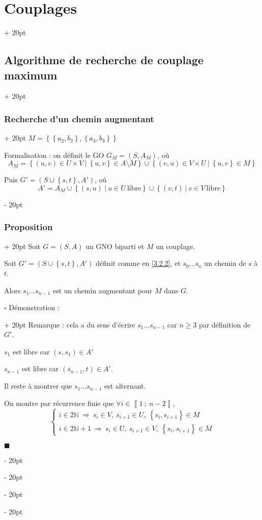 \documentclass[a4paper, 12pt, twoside]{article}
\newcommand{\N}{\mathbb{N}} %
\newcommand{\nset}[2]{\left\llbracket #1\ ;\ #2 \right\rrbracket}
\newcommand{\set}[1]{\left\{ #1 \right\}}
\renewcommand{\ge}{\geqslant}
\newcommand{\ind}[1][20pt]{\advance\leftskip + #1}
\newcommand{\deind}[1][20pt]{\advance\leftskip - #1}
\newenvironment{indt}[2][20pt]{#2 \par \ind[#1]}{\par \deind} %
\newenvironment{proof}[1][{Démonstration :}]{\begin{indt}{$\square$ #1}}{$\blacksquare$ \end{indt}}
\begin{document}
\begin{indt}{\section{Couplages}}
\begin{indt}{\subsection{Algorithme de recherche de couplage maximum}}
\begin{indt}{\subsubsection{Recherche d'un chemin augmentant}}
                $M = \set{\set{a_2, b_2}, \set{a_3, b_3}}$

                \vspace{12pt}
                
                Formalisation : on définit le GO $G_M = (S, A_M)$, où
                \[
                    A_M = \set{(u, v) \in U \times V\ |\ \set{u, v} \in A \setminus M} \cup \set{(v, u) \in V \times U\ |\ \set{u, v} \in M}
                \]

                Puis $G' = (S \cup \set{s, t}, A')$, où
                \[
                    A' = A_M \cup \set{(s, u)\ |\ u \in U\ \text{libre}} \cup \set{(v, t)\ |\ v \in V\ \text{libre}}
                \]
            \end{indt}

            \vspace{12pt}
            
            \begin{indt}{\subsubsection{Proposition}}
                Soit $G = (S, A)$ un GNO biparti et $M$ un couplage.

                Soit $G' = (S \cup \set{s, t}, A')$ définit comme en \ref{3.2.2}, et $s_0 \ldots s_n$ un chemin de $s$ à $t$.

                Alors $s_1 \ldots s_{n - 1}$ est un chemin augmentant pour $M$ dans $G$.

                \vspace{12pt}
                
                \begin{proof}
                    Remarque : cela a du sens d'écrire $s_1 \ldots s_{n - 1}$ car $n \ge 3$ par définition de $G'$.

                    $s_1$ est libre car $(s, s_1) \in A'$

                    $s_{n - 1}$ est libre car $(s_{n - 1}, t) \in A'$.

                    Il reste à montrer que $s_1 \ldots s_{n - 1}$ est alternant.

                    On montre par récurrence finie que $\forall i \in \nset 1 {n - 2}$,
                    \[
                        \begin{cases}
                            i \in 2\N\ \Rightarrow\ s_i \in V,\ s_{i + 1} \in U,\ \set{s_i, s_{i + 1}} \in M
                            \\
                            i \in 2\N + 1\ \Rightarrow\ s_i \in U,\ s_{i + 1} \in V,\ \set{s_i, s_{i + 1}} \in M
                        \end{cases}
                    \]


\end{proof}
\end{indt}
\end{indt}
\end{indt}
\end{document}
